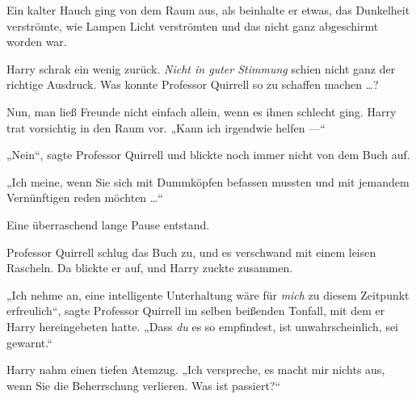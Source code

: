 Ein kalter Hauch ging von dem Raum aus, als beinhalte er etwas, das Dunkelheit verströmte, wie Lampen Licht verströmten und das nicht ganz abgeschirmt worden war.

Harry schrak ein wenig zurück. \emph{Nicht in guter Stimmung} schien nicht ganz der richtige Ausdruck. Was konnte Professor Quirrell so zu schaffen machen …?

Nun, man ließ Freunde nicht einfach allein, wenn es ihnen schlecht ging. Harry trat vorsichtig in den Raum vor.
„Kann ich irgendwie helfen —“

„Nein“, sagte Professor Quirrell und blickte noch immer nicht von dem Buch auf.

„Ich meine, wenn Sie sich mit Dummköpfen befassen mussten und mit jemandem Vernünftigen reden möchten …“

Eine überraschend lange Pause entstand.

Professor Quirrell schlug das Buch zu, und es verschwand mit einem leisen Rascheln. Da blickte er auf, und Harry zuckte zusammen.

„Ich nehme an, eine intelligente Unterhaltung wäre für \emph{mich} zu diesem Zeitpunkt erfreulich“, sagte Professor Quirrell im selben beißenden Tonfall, mit dem er Harry hereingebeten hatte.
„Dass \emph{du} es so empfindest, ist unwahrscheinlich, sei gewarnt.“

Harry nahm einen tiefen Atemzug.
„Ich verspreche, es macht mir nichts aus, wenn Sie die Beherrschung verlieren. Was ist passiert?“

